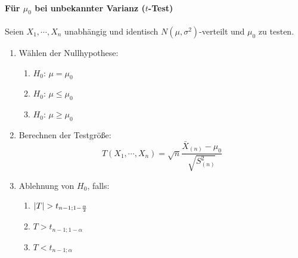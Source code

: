         \paragraph{Für \(\mu_0\) bei unbekannter Varianz (\(t\)-Test)}
            Seien \( X_1, \cdots, X_n \) unabhängig und identisch \( N(\mu, \sigma^2) \)-verteilt und \(\mu_0\) zu testen.
            \begin{enumerate}
            	\item Wählen der Nullhypothese:
                	\begin{enumerate}[label = \Alph*)]
                		\item \( H_0 \): \quad \( \mu = \mu_0 \)
                		\item \( H_0 \): \quad \( \mu \leq \mu_0 \)
                		\item \( H_0 \): \quad \( \mu \geq \mu_0 \)
                	\end{enumerate}
            	\item Berechnen der Testgröße:
                	\begin{equation*}
	                	T(X_1, \cdots, X_n) = \sqrt{n} \frac{\bar{X}_{(n)} - \mu_0}{\sqrt{S_{(n)}^2}}
                	\end{equation*}
                \item Ablehnung von \(H_0\), falls:
	                \begin{enumerate}[label = \Alph*)]
	                	\item \( \abs{T} > t_{n - 1; 1 - \frac{\alpha}{2}} \)
	                	\item \( T > t_{n - 1; 1 - \alpha} \)
	                	\item \( T < t_{n - 1; \alpha} \)
	                \end{enumerate}
            \end{enumerate}

